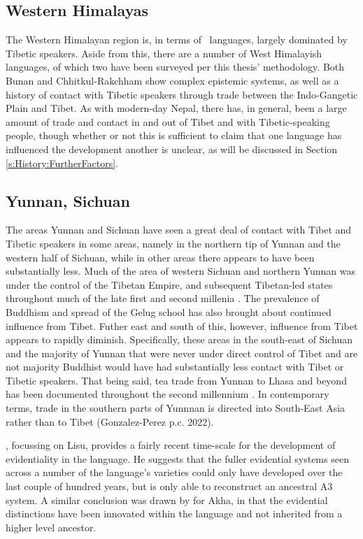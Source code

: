 \subsection{Western Himalayas}
The Western Himalayan region is, in terms of \lfam\ languages, largely dominated by Tibetic speakers. Aside from this, there are a number of West Himalayish languages, of which two have been surveyed per this thesis' methodology. Both Bunan \cite{Widmer2020} and Chhitkul-Rakchham \cite{Martinez2021} show complex epistemic systems, as well as a history of contact with Tibetic speakers through trade between the Indo-Gangetic Plain and Tibet. As with modern-day Nepal, there has, in general, been a large amount of trade and contact in and out of Tibet and with Tibetic-speaking people, though whether or not this is sufficient to claim that one language has influenced the development another is unclear, as will be discussed in Section \ref{s:History:FurtherFactors}.

\subsection{Yunnan, Sichuan}\label{ss:History:YunSich}
The areas Yunnan and Sichuan have seen a great deal of contact with Tibet and Tibetic speakers in some areas, namely in the northern tip of Yunnan and the western half of Sichuan, while in other areas there appears to have been substantially less. Much of the area of western Sichuan and northern Yunnan was under the control of the Tibetan Empire, and subsequent Tibetan-led states throughout much of the late first and second millenia \cite{Schaik2013}. The prevalence of Buddhism and spread of the Gelug school has also brought about continued influence from Tibet. Futher east and south of this, however, influence from Tibet appears to rapidly diminish. Specifically, these areas in the south-east of Sichuan and the majority of Yunnan that were never under direct control of Tibet and are not majority Buddhist would have had substantially less contact with Tibet or Tibetic speakers. That being said, tea trade from Yunnan to Lhasa and beyond has been documented throughout the second millennium \cite{Sigley2020}. In contemporary terms, trade in the southern parts of Yunnnan is directed into South-East Asia rather than to Tibet (Gonzalez-Perez p.c. 2022).

, focussing on Lisu, provides a fairly recent time-scale for the development of evidentiality in the language. He suggests that the fuller evidential systems seen across a number of the language's varieties could only have developed over the last couple of hundred years, but is only able to reconstruct an ancestral A3 system. A similar conclusion was drawn by  for Akha, in that the evidential distinctions have been innovated within the language and not inherited from a higher level ancestor.

